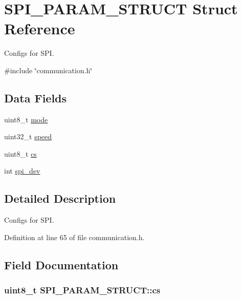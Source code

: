 \hypertarget{structSPI__PARAM__STRUCT}{
\section{SPI\_\-PARAM\_\-STRUCT Struct Reference}
\label{structSPI__PARAM__STRUCT}
}


Configs for SPI.  




{\ttfamily \#include \char`\"{}communication.h\char`\"{}}

\subsection*{Data Fields}
\begin{DoxyCompactItemize}
\item 
uint8\_\-t \hyperlink{structSPI__PARAM__STRUCT_a82c546c99f6c3daed73c1e23426be847}{mode}
\item 
uint32\_\-t \hyperlink{structSPI__PARAM__STRUCT_a53a8d386594a81eb9bc6f971bfe36c54}{speed}
\item 
uint8\_\-t \hyperlink{structSPI__PARAM__STRUCT_ae0d62e0a5554783d710b677a017e246f}{cs}
\item 
int \hyperlink{structSPI__PARAM__STRUCT_abe385c44333d268d17cf648c8e371cad}{spi\_\-dev}
\end{DoxyCompactItemize}


\subsection{Detailed Description}
Configs for SPI. 

Definition at line 65 of file communication.h.



\subsection{Field Documentation}
\hypertarget{structSPI__PARAM__STRUCT_ae0d62e0a5554783d710b677a017e246f}{
\subsubsection[{cs}]{\setlength{\rightskip}{0pt plus 5cm}uint8\_\-t {\bf SPI\_\-PARAM\_\-STRUCT::cs}}}
\label{structSPI__PARAM__STRUCT_ae0d62e0a5554783d710b677a017e246f}


